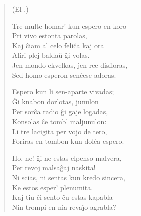 \begin{verse}
\begin{center}
\footnotesize (El .)
\end{center}
                  Tre multe homar' kun espero en koro\\
                  Pri vivo estonta parolas,\\
                  Kaj \^ciam al celo feli\^ca kaj ora\\
                  Aliri plej balda\u u \^gi volas.\\
                  Jen mondo ekvelkas, jen ree disfloras, ---\\
                  Sed homo esperon sen\^cese adoras.

                  Espero kun li sen-aparte vivadas;\\
                  \^Gi knabon dorlotas, junulon\\
                  Per sor\^ca radio \^gi gaje logadas,\\
                  Konsolas \^ce tomb' maljunulon:\\
                  Li tre lacigita per vojo de tero,\\
                  Foriras en tombon kun dol\^ca espero.

                  Ho, ne! \^gi ne estas elpenso malvera,\\
                  Per revoj malsa\^gaj naskita!\\
                  Ni scias, ni sentas kun kredo sincera,\\
                  Ke estos esper' plenumita.\\
                  Kaj tiu \^ci sento \^cu estas kapabla\\
                  Nin trompi en nia reva\^{\j}o agrabla?
\end{verse}


\smallrule{}
